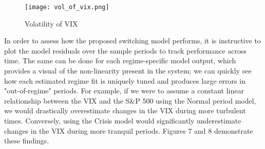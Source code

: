 \documentclass[11pt,a4paper,oldfontcommands]{memoir}
\begin{document}
{\begin{figure}[H]
\caption{Volatility of VIX}
\texttt{[image: vol\_of\_vix.png]} 
\centering
\label{}
\end{figure}



In order to assess how the proposed switching model performs, it is instructive to plot the model residuals over the sample periods to track performance across time. The same can be done for each regime-specific model output, which provides a visual of the non-linearity present in the system; we can quickly see how each estimated regime fit is uniquely tuned and produces large errors in "out-of-regime" periods. For example, if we were to assume a constant linear relationship between the VIX and the S\&P 500 using the Normal period model, we would drastically overestimate changes in the VIX during more turbulent times. Conversely, using the Crisis model would significantly underestimate changes in the VIX during more tranquil periods. Figures 7 and 8 demonstrate these findings. 






}
\end{document}
